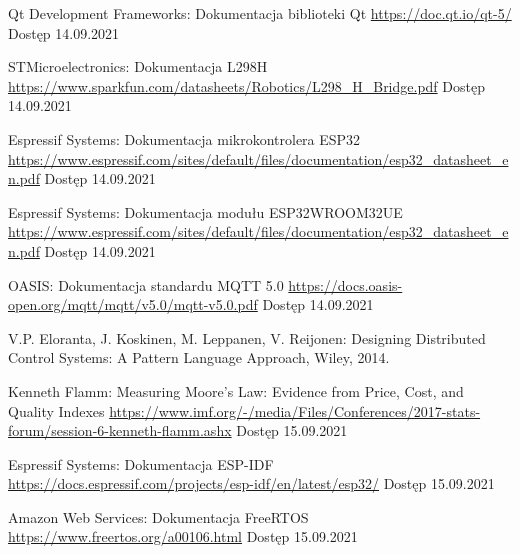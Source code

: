 
  \begin{thebibliography}{9}

        Qt Development Frameworks: Dokumentacja biblioteki Qt \newline
        \url{https://doc.qt.io/qt-5/} \newline
        Dostęp 14.09.2021
    
        STMicroelectronics: Dokumentacja L298H \newline
        \url{https://www.sparkfun.com/datasheets/Robotics/L298_H_Bridge.pdf} \newline
        Dostęp 14.09.2021
    
        Espressif Systems: Dokumentacja mikrokontrolera ESP32
        \url{https://www.espressif.com/sites/default/files/documentation/esp32_datasheet_en.pdf} \newline
        Dostęp 14.09.2021
    
        Espressif Systems: Dokumentacja modułu ESP32­WROOM­32UE
        \url{https://www.espressif.com/sites/default/files/documentation/esp32_datasheet_en.pdf} \newline
        Dostęp 14.09.2021
    
        OASIS: Dokumentacja standardu MQTT 5.0 \newline
        \url{https://docs.oasis-open.org/mqtt/mqtt/v5.0/mqtt-v5.0.pdf} \newline
        Dostęp 14.09.2021
    
        V.P. Eloranta, J. Koskinen, M. Leppanen, V. Reijonen: 
        Designing Distributed Control Systems: A Pattern Language Approach, 
        Wiley, 2014.
    
        Kenneth Flamm: Measuring Moore’s Law: Evidence from Price, Cost, and Quality Indexes  \newline
        \url{https://www.imf.org/-/media/Files/Conferences/2017-stats-forum/session-6-kenneth-flamm.ashx} \newline
        Dostęp 15.09.2021
    
        Espressif Systems: Dokumentacja ESP-IDF  \newline
        \url{https://docs.espressif.com/projects/esp-idf/en/latest/esp32/} \newline
        Dostęp 15.09.2021
    
        Amazon Web Services: Dokumentacja FreeRTOS  \newline
        \url{https://www.freertos.org/a00106.html} \newline
        Dostęp 15.09.2021
    

\end{thebibliography}
